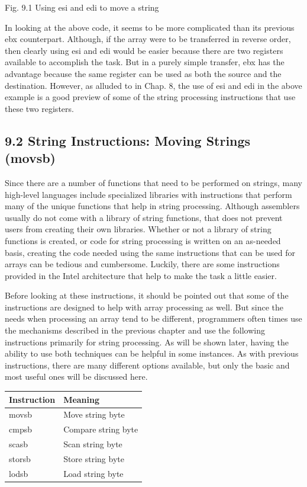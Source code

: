 \documentclass[10pt]{article}
\begin{document}
Fig. 9.1 Using esi and edi to move a string

In looking at the above code, it seems to be more complicated than its previous ebx counterpart. Although, if the array were to be transferred in reverse order, then clearly using esi and edi would be easier because there are two registers available to accomplish the task. But in a purely simple transfer, ebx has the advantage because the same register can be used as both the source and the destination. However, as alluded to in Chap. 8, the use of esi and edi in the above example is a good preview of some of the string processing instructions that use these two registers.

\subsection*{9.2 String Instructions: Moving Strings (movsb)}
Since there are a number of functions that need to be performed on strings, many high-level languages include specialized libraries with instructions that perform many of the unique functions that help in string processing. Although assemblers usually do not come with a library of string functions, that does not prevent users from creating their own libraries. Whether or not a library of string functions is created, or code for string processing is written on an as-needed basis, creating the code needed using the same instructions that can be used for arrays can be tedious and cumbersome. Luckily, there are some instructions provided in the Intel architecture that help to make the task a little easier.

Before looking at these instructions, it should be pointed out that some of the instructions are designed to help with array processing as well. But since the needs when processing an array tend to be different, programmers often times use the mechanisms described in the previous chapter and use the following instructions primarily for string processing. As will be shown later, having the ability to use both techniques can be helpful in some instances. As with previous instructions, there are many different options available, but only the basic and most useful ones will be discussed here.

\begin{center}
\begin{tabular}{|l|l|}
\hline
Instruction & Meaning \\
\hline
movsb & Move string byte \\
\hline
cmpsb & Compare string byte \\
\hline
scasb & Scan string byte \\
\hline
storsb & Store string byte \\
\hline
lodsb & Load string byte \\
\hline
\end{tabular}
\end{center}
\end{document}
